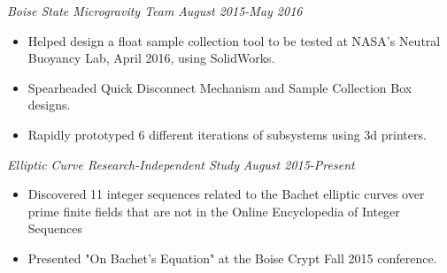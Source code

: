 \documentclass[letterpaper]{article}
\begin{document}
\vspace{.06in}
\begin{multicols}{2}
\textit{Boise State Microgravity Team}
\vfill
\columnbreak
\textit{August 2015-May 2016}
\end{multicols}
\begin{itemize}
    \item Helped design a float sample collection tool to be tested at NASA's Neutral Buoyancy Lab, April 2016, using SolidWorks.
    \item Spearheaded Quick Disconnect Mechanism and Sample Collection Box designs. 
	\item Rapidly prototyped 6 different iterations of subsystems using 3d printers.
\end{itemize}

\vspace{.06in}
\begin{multicols}{2}
\textit{Elliptic Curve Research-Independent Study}
\vfill
\columnbreak
\textit{August 2015-Present}
\end{multicols}
\begin{itemize}
    \item Discovered 11 integer sequences related to the Bachet elliptic curves over prime finite fields that are not in the Online Encyclopedia of Integer Sequences
    \item Presented "On Bachet's Equation" at the Boise Crypt Fall 2015 conference.
\end{itemize}
\end{document}
